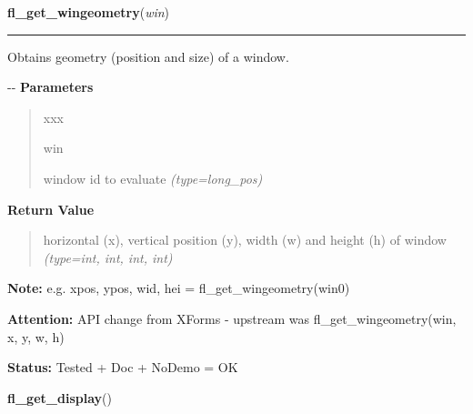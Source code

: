 \hspace{.8\funcindent}\begin{boxedminipage}{\funcwidth}

    \raggedright \textbf{fl\_get\_wingeometry}(\textit{win})

    \vspace{-1.5ex}

    \rule{\textwidth}{0.5\fboxrule}
\setlength{\parskip}{2ex}

Obtains geometry (position and size) of a window.

-{}-
\setlength{\parskip}{1ex}
      \textbf{Parameters}
      \vspace{-1ex}

      \begin{quote}
        \begin{Ventry}{xxx}

          \item[win]


window id to evaluate
            {\it (type=long\_pos)}

        \end{Ventry}

      \end{quote}

      \textbf{Return Value}
    \vspace{-1ex}

      \begin{quote}

horizontal (x), vertical position (y), width (w) and height (h)
of window
      {\it (type=int, int, int, int)}

      \end{quote}

\textbf{Note:} 
e.g. xpos, ypos, wid, hei = fl\_get\_wingeometry(win0)


\textbf{Attention:} 
API change from XForms - upstream was
fl\_get\_wingeometry(win, x, y, w, h)


\textbf{Status:} 
Tested + Doc + NoDemo = OK


    \end{boxedminipage}

    \label{xformslib:flxbasic:fl_get_display}

    \vspace{0.5ex}

\hspace{.8\funcindent}\begin{boxedminipage}{\funcwidth}

    \raggedright \textbf{fl\_get\_display}()

\setlength{\parskip}{2ex}
\setlength{\parskip}{1ex}
    \end{boxedminipage}

